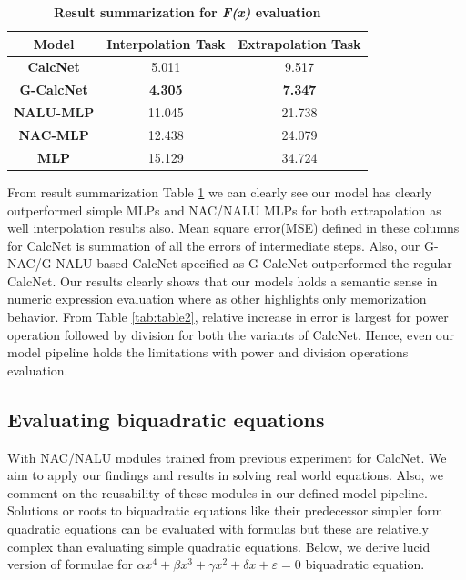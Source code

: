 \documentclass[conference]{IEEEtran}
\begin{document}
\bgroup
\def\arraystretch{1.5}
\begin{table}[h!]
  \begin{center}
    \caption{\textbf{Result summarization for \textit{F(x)} evaluation}}
    \label{tab:table3}
    \begin{tabular}{|c|c|c|}
    
    \hline
      \textbf{Model} & \textbf{Interpolation Task} & \textbf{Extrapolation Task}\\
    \hline
      \textbf{CalcNet} & 5.011 & 9.517 \\
    \hline
      \textbf{G-CalcNet} & \textbf{4.305} & \textbf{7.347} \\
    \hline
      \textbf{NALU-MLP} & 11.045 & 21.738 \\
    \hline
      \textbf{NAC-MLP} & 12.438 & 24.079 \\
    \hline
      \textbf{MLP} & 15.129 & 34.724 \\


    \hline 
    \end{tabular}
  \end{center}
\end{table}
\egroup

From result summarization Table \ref{tab:table3} we can clearly see our model has clearly outperformed simple MLPs and NAC/NALU MLPs for both extrapolation as well interpolation results also. Mean square error(MSE) defined in these columns for CalcNet is summation of all the errors of intermediate steps. Also, our G-NAC/G-NALU based CalcNet specified as G-CalcNet outperformed the regular CalcNet. Our results clearly shows that our models holds a semantic sense in numeric expression evaluation where as other highlights only memorization behavior. From Table \ref{tab:table2}, relative increase in error is largest for power operation followed by division for both the variants of CalcNet. Hence, even our model pipeline holds the limitations with power and division operations evaluation. 

\subsection{Evaluating biquadratic equations}

With NAC/NALU modules trained from previous experiment for CalcNet. We aim to apply our findings and results in solving real world equations. Also, we comment on the reusability of these modules in our defined model pipeline. Solutions or roots to biquadratic equations like their predecessor simpler form quadratic equations can be evaluated with formulas but these are relatively complex than evaluating simple quadratic equations. Below, we derive lucid version of formulae for $\alpha x^{4}+\beta x^{3}+\gamma x^{2}+\delta x+\varepsilon =0$ biquadratic equation. 
\end{document}
